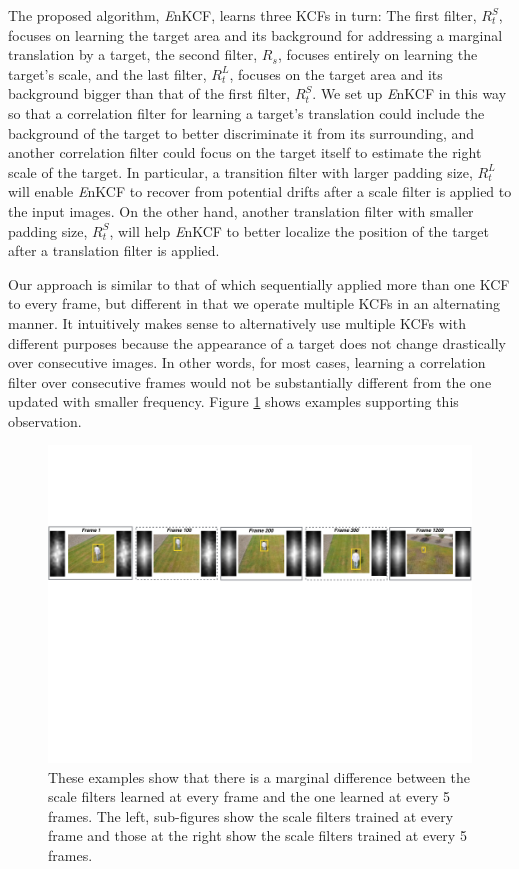 \documentclass[10pt,twocolumn,letterpaper]{article}
\begin{document}
The proposed algorithm, {\it E}nKCF, learns three KCFs in turn: The
first filter, $R_{t}^{S}$, focuses on learning the target area and its
background for addressing a marginal translation by a target, the
second filter, $R_{s}$, focuses entirely on learning the target's
scale, and the last filter, $R_{t}^{L}$, focuses on the target area
and its background bigger than that of the first filter,
$R_{t}^{S}$. We set up {\it E}nKCF in this way so that a correlation
filter for learning a target's translation could include the
background of the target to better discriminate it from its
surrounding, and another correlation filter could focus on the target
itself to estimate the right scale of the target. In particular, a
transition filter with larger padding size, $R_{t}^{L}$ will enable
{\it E}nKCF to recover from potential drifts after a scale filter is
applied to the input images. On the other hand, another translation filter with
smaller padding size, $R_{t}^{S}$, will help {\it E}nKCF to better
localize the position of the target after a translation filter is
applied.

Our approach is similar to that of \cite{ma2015long} which
sequentially applied more than one KCF to every frame, but different
in that we operate multiple KCFs in an alternating manner. It
intuitively makes sense to alternatively use multiple KCFs with
different purposes because the appearance of a target does not change
drastically over consecutive images. In other words, for most cases,
learning a correlation filter over consecutive frames would not be
substantially different from the one updated with smaller
frequency. Figure \ref{fig:Filters_Comparison} shows examples
supporting this observation.

\begin{figure}[!h]
\centering
\includegraphics[width=1\textwidth]{./figures/LearnedFiltersComparison2.pdf}
\caption{These examples show that there is a marginal difference
  between the scale filters learned at every frame and the one learned
  at every 5 frames. The left, sub-figures show the scale filters
  trained at every frame and those at the right show the scale filters
  trained at every 5 frames.}
\label{fig:Filters_Comparison}
\end{figure}
\end{document}
